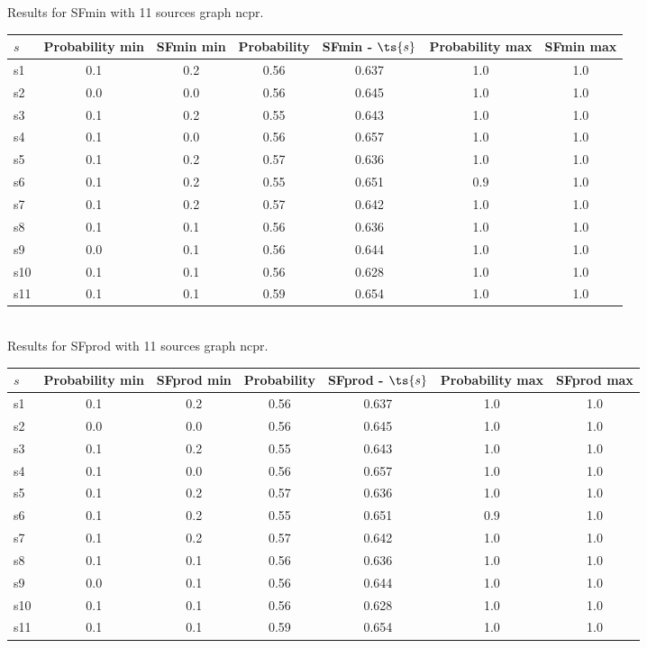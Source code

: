 \documentclass{article}
\begin{document}
\noindent Results for SFmin with 11 sources graph ncpr.

\noindent\begin{tabular}{|l|c|c|c|c|c|c|}
\hline
$s$& Probability min & SFmin min & Probability & SFmin - $\ts{s}$ & Probability max & SFmin max\\
\hline
s1 &0.1 & 0.2 & 0.56 & 0.637 & 1.0 & 1.0\\
\hline
s2 &0.0 & 0.0 & 0.56 & 0.645 & 1.0 & 1.0\\
\hline
s3 &0.1 & 0.2 & 0.55 & 0.643 & 1.0 & 1.0\\
\hline
s4 &0.1 & 0.0 & 0.56 & 0.657 & 1.0 & 1.0\\
\hline
s5 &0.1 & 0.2 & 0.57 & 0.636 & 1.0 & 1.0\\
\hline
s6 &0.1 & 0.2 & 0.55 & 0.651 & 0.9 & 1.0\\
\hline
s7 &0.1 & 0.2 & 0.57 & 0.642 & 1.0 & 1.0\\
\hline
s8 &0.1 & 0.1 & 0.56 & 0.636 & 1.0 & 1.0\\
\hline
s9 &0.0 & 0.1 & 0.56 & 0.644 & 1.0 & 1.0\\
\hline
s10 &0.1 & 0.1 & 0.56 & 0.628 & 1.0 & 1.0\\
\hline
s11 &0.1 & 0.1 & 0.59 & 0.654 & 1.0 & 1.0\\
\hline
\end{tabular}\\

\noindent Results for SFprod with 11 sources graph ncpr.

\noindent\begin{tabular}{|l|c|c|c|c|c|c|}
\hline
$s$& Probability min & SFprod min & Probability & SFprod - $\ts{s}$ & Probability max & SFprod max\\
\hline
s1 &0.1 & 0.2 & 0.56 & 0.637 & 1.0 & 1.0\\
\hline
s2 &0.0 & 0.0 & 0.56 & 0.645 & 1.0 & 1.0\\
\hline
s3 &0.1 & 0.2 & 0.55 & 0.643 & 1.0 & 1.0\\
\hline
s4 &0.1 & 0.0 & 0.56 & 0.657 & 1.0 & 1.0\\
\hline
s5 &0.1 & 0.2 & 0.57 & 0.636 & 1.0 & 1.0\\
\hline
s6 &0.1 & 0.2 & 0.55 & 0.651 & 0.9 & 1.0\\
\hline
s7 &0.1 & 0.2 & 0.57 & 0.642 & 1.0 & 1.0\\
\hline
s8 &0.1 & 0.1 & 0.56 & 0.636 & 1.0 & 1.0\\
\hline
s9 &0.0 & 0.1 & 0.56 & 0.644 & 1.0 & 1.0\\
\hline
s10 &0.1 & 0.1 & 0.56 & 0.628 & 1.0 & 1.0\\
\hline
s11 &0.1 & 0.1 & 0.59 & 0.654 & 1.0 & 1.0\\
\hline
\end{tabular}\\
\end{document}
